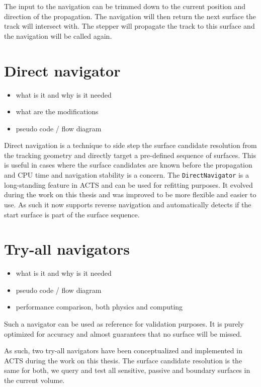The input to the navigation can be trimmed down to the current position and direction of the propagation. The navigation will then return the next surface the track will intersect with. The stepper will propagate the track to this surface and the navigation will be called again.

\section{Direct navigator}

\begin{itemize}
    \color{red}
    \item what is it and why is it needed
    \item what are the modifications
    \item pseudo code / flow diagram
\end{itemize}

Direct navigation is a technique to side step the surface candidate resolution from the tracking geometry and directly target a pre-defined sequence of surfaces. This is useful in cases where the surface candidates are known before the propagation and CPU time and navigation stability is a concern. The \texttt{DirectNavigator} is a long-standing feature in ACTS and can be used for refitting purposes. It evolved during the work on this thesis and was improved to be more flexible and easier to use. As such it now supports reverse navigation and automatically detects if the start surface is part of the surface sequence.

\section{Try-all navigators}

\begin{itemize}
    \color{red}
    \item what is it and why is it needed
    \item pseudo code / flow diagram
    \item performance comparison, both physics and computing
\end{itemize}

Such a navigator can be used as reference for validation purposes. It is purely optimized for accuracy and almost guarantees that no surface will be missed.

As such, two try-all navigators have been conceptualized and implemented in ACTS during the work on this thesis. The surface candidate resolution is the same for both, we query and test all sensitive, passive and boundary surfaces in the current volume.

